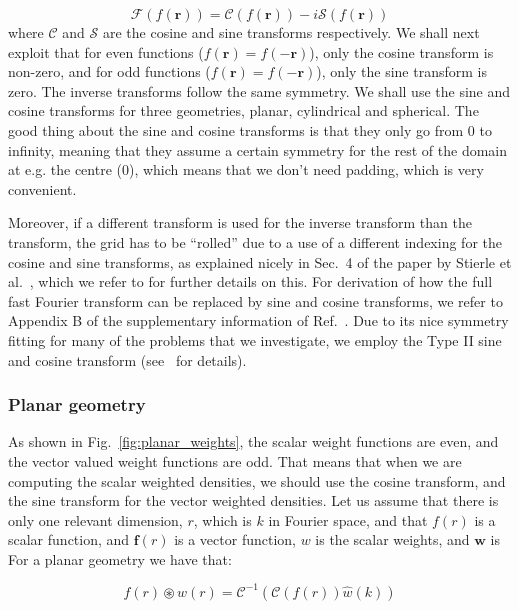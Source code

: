 \documentclass[12pt, letterpaper]{article}
\begin{document}
\begin{equation}
\mathscr{F}(f(\mathbf{r}))=\mathscr{C}(f(\mathbf{r}))-i\mathscr{S}(f(\mathbf{r}))
\end{equation}
where $\mathscr{C}$ and $\mathscr{S}$ are the cosine and sine transforms respectively. We shall next exploit that for even functions ($f(\mathbf{r})=f(-\mathbf{r})$), only the cosine transform is non-zero, and for odd functions ($f(\mathbf{r})=f(-\mathbf{r})$), only the sine transform is zero. The inverse transforms follow the same symmetry. We shall use the sine and cosine transforms for three geometries, planar, cylindrical and spherical. The good thing about the sine and cosine transforms is that they only go from 0 to infinity, meaning that they assume a certain symmetry for the rest of the domain at e.g. the centre (0), which means that we don't need padding, which is very convenient.

Moreover, if a different transform is used for the inverse transform than the transform, the grid has to be ``rolled'' due to a use of a different indexing for the cosine and sine transforms, as explained nicely in Sec.~4 of the paper by Stierle et al.~\cite{stierle2020a}, which we refer to for further details on this. For derivation of how the full fast Fourier transform can be replaced by sine and cosine transforms, we refer to Appendix B of the supplementary information of Ref.~\cite{stierle2020a}. Due to its nice symmetry fitting for many of the problems that we investigate, we employ the Type II sine and cosine transform (see~\cite{sinecosine_webpage} for details).

\subsubsection{Planar geometry}
As shown in Fig.~\ref{fig:planar_weights}, the scalar weight functions are even, and the vector valued weight functions are odd. That means that when we are computing the scalar weighted densities, we should use the cosine transform, and the sine transform for the vector weighted densities. Let us assume that there is only one relevant dimension, $r$, which is $k$ in Fourier space, and that $f(r)$ is a scalar function, and $\mathbf{f}(r)$ is a vector function, $w$ is the scalar weights, and $\mathbf{w}$ is  For a planar geometry we have that:

\begin{equation}
  f(r)\circledast w(r) = \mathscr{C}^{-1}\left(\mathscr{C}\left(f(r)\right)\hat{w}(k)\right)
  \label{eq:p1}
\end{equation}
\end{document}
